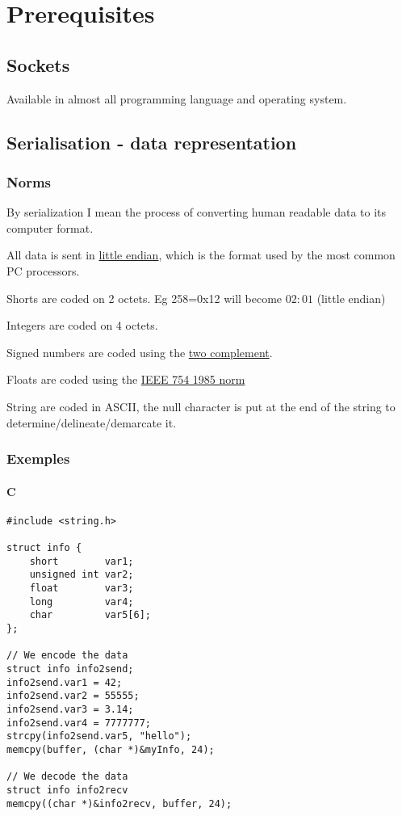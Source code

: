 \documentclass{article}
\begin{document}
\clearpage

\section{Prerequisites}

\subsection{Sockets}
Available in almost all programming language and operating system.

\subsection{Serialisation - data representation}

\subsubsection{Norms}

By serialization  I mean the process of converting human readable data to its computer format.

All data is sent in \href{http://en.wikipedia.org/wiki/Endianness}{little endian}, which is the format used by the most common PC processors. 

Shorts are coded on 2 octets. Eg 258=0x12 will become $02:01$ (little endian)

Integers are coded on 4 octets.

Signed numbers are coded using the \href{http://en.wikipedia.org/wiki/Two\%27s\_complement}{two complement}.

Floats are coded using the \href{http://en.wikipedia.org/wiki/IEEE\_754-1985}{IEEE 754 1985 norm}

String are coded in ASCII, the null character is put at the end of the string to determine/delineate/demarcate it.

\subsubsection{Exemples}

\paragraph{C}

\begin{verbatim}
#include <string.h>

struct info {
	short        var1;
	unsigned int var2;
	float        var3;
	long         var4;
	char         var5[6];
};

// We encode the data
struct info info2send;
info2send.var1 = 42;
info2send.var2 = 55555;
info2send.var3 = 3.14;
info2send.var4 = 7777777;
strcpy(info2send.var5, "hello");
memcpy(buffer, (char *)&myInfo, 24);

// We decode the data
struct info info2recv
memcpy((char *)&info2recv, buffer, 24);

\end{verbatim}
\end{document}
